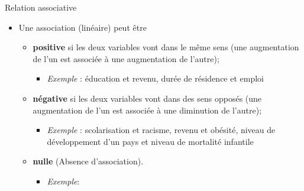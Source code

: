 \documentclass[ignorenonframetext,]{beamer}
\providecommand{\tightlist}{%
  \setlength{\itemsep}{0pt}\setlength{\parskip}{0pt}}
\begin{document}
\begin{frame}{Relation associative}
\protect\hypertarget{relation-associative}{}

\begin{itemize}
\tightlist
\item
  Une association (linéaire) peut être

  \begin{itemize}
  \tightlist
  \item
    \textbf{positive} si les deux variables vont dans le même sens (une
    augmentation de l'un est associée à une augmentation de l'autre);

    \begin{itemize}
    \tightlist
    \item
      \emph{Exemple} : éducation et revenu, durée de résidence et emploi
    \end{itemize}
  \item
    \textbf{négative} si les deux variables vont dans des sens opposés
    (une augmentation de l'un est associée à une diminution de l'autre);

    \begin{itemize}
    \tightlist
    \item
      \emph{Exemple} : scolarisation et racisme, revenu et obésité,
      niveau de développement d'un pays et niveau de mortalité infantile
    \end{itemize}
  \item
    \textbf{nulle} (Absence d'association).

    \begin{itemize}
    \tightlist
    \item
      \emph{Exemple}:
    \end{itemize}
  \end{itemize}
\end{itemize}

\end{frame}
\end{document}
